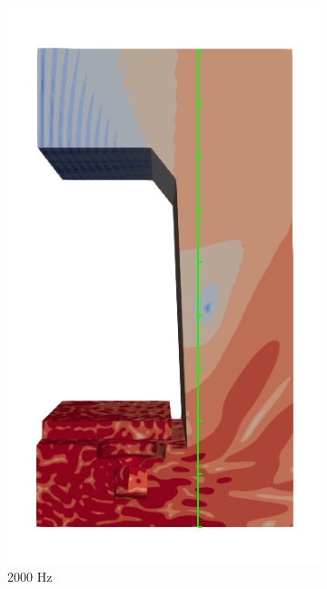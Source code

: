 \begin{figure}[H]
\begin{subfigure}[b]{0.3\textwidth}
		\includegraphics[width=\linewidth]{fig/chap5/freq_steps/field_result_2000Hz.png}
		\caption{2000 Hz}
		\label{fig:field_2000Hz}
	\end{subfigure}
	\hfill
	\begin{subfigure}[b]{0.3\textwidth}
		\centering

\end{subfigure}
\end{figure}

